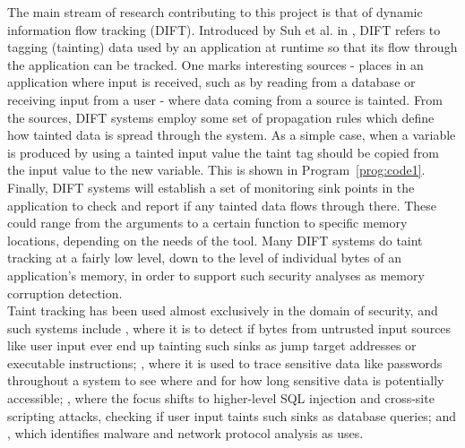 \documentclass[msc,oneside]{ubcthesis}
\begin{document}
	The main stream of research contributing to this project is that of dynamic information flow tracking (DIFT). Introduced by Suh et al. in \cite{Suh2004}, DIFT refers to tagging (tainting) data used by an application at runtime so that its flow through the application can be tracked. One marks interesting sources - places in an application where input is received, such as by reading from a database or receiving input from a user - where data coming from a source is tainted. From the sources, DIFT systems employ some set of propagation rules which define how tainted data is spread through the system. As a simple case, when a variable is produced by using a tainted input value the taint tag should be copied from the input value to the new variable. This is shown in Program~\ref{prog:code1}. Finally, DIFT systems will establish a set of monitoring sink points in the application to check and report if any tainted data flows through there. These could range from the arguments to a certain function to specific memory locations, depending on the needs of the tool. Many DIFT systems do taint tracking at a fairly low level, down to the level of individual bytes of an application's memory, in order to support such security analyses as memory corruption detection. \\

	Taint tracking has been used almost exclusively in the domain of security, and such systems include \cite{Suh2004} \cite{Newsome2005}, where it is to detect if bytes from untrusted input sources like user input ever end up tainting such sinks as jump target addresses or executable instructions; \cite{Hudgins2004}, where it is used to trace sensitive data like passwords throughout a system to see where and for how long sensitive data is potentially accessible; \cite{Dalton2007}, where the focus shifts to higher-level SQL injection and cross-site scripting attacks, checking if user input taints such sinks as database queries; and \cite{Al-Saleh2010a}, which identifies malware and network protocol analysis as uses. \\
	
\end{document}
